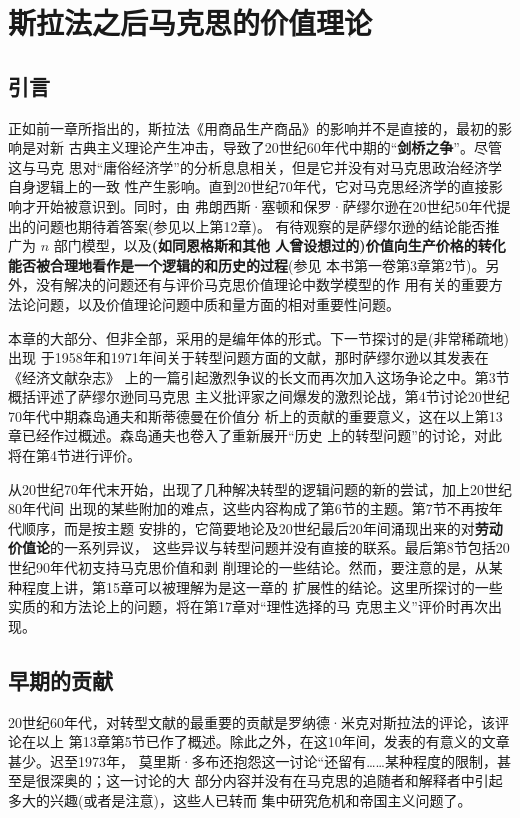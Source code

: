 \chapter{斯拉法之后马克思的价值理论}

\section{引言}

正如前一章所指出的，斯拉法《用商品生产商品》的影响并不是直接的，最初的影响是对新
古典主义理论产生冲击，导致了20世纪60年代中期的“\textbf{剑桥之争}”。尽管这与马克
思对“庸俗经济学”的分析息息相关，但是它并没有对马克思政治经济学自身逻辑上的一致
性产生影响。直到20世纪70年代，它对马克思经济学的直接影响才开始被意识到。同时，由
弗朗西斯·塞顿和保罗·萨缪尔逊在20世纪50年代提出的问题也期待着答案(参见以上第12章)。
有待观察的是萨缪尔逊的结论能否推广为 $n$ 部门模型，以及\textbf{(如同恩格斯和其他
  人曾设想过的)价值向生产价格的转化能否被合理地看作是一个逻辑的和历史的过程}(参见
本书第一卷第3章第2节)。另外，没有解决的问题还有与评价马克思价值理论中数学模型的作
用有关的重要方法论问题，以及价值理论问题中质和量方面的相对重要性问题。

本章的大部分、但非全部，采用的是编年体的形式。下一节探讨的是(非常稀疏地)出现
于1958年和1971年间关于转型问题方面的文献，那时萨缪尔逊以其发表在《经济文献杂志》
上的一篇引起激烈争议的长文而再次加入这场争论之中。第3节概括评述了萨缪尔逊同马克思
主义批评家之间爆发的激烈论战，第4节讨论20世纪70年代中期森岛通夫和斯蒂德曼在价值分
析上的贡献的重要意义，这在以上第13章已经作过概述。森岛通夫也卷入了重新展开“历史
上的转型问题”的讨论，对此将在第4节进行评价。

从20世纪70年代末开始，出现了几种解决转型的逻辑问题的新的尝试，加上20世纪80年代间
出现的某些附加的难点，这些内容构成了第6节的主题。第7节不再按年代顺序，而是按主题
安排的，它简要地论及20世纪最后20年间涌现出来的对\textbf{劳动价值论}的一系列异议，
这些异议与转型问题并没有直接的联系。最后第8节包括20世纪90年代初支持马克思价值和剥
削理论的一些结论。然而，要注意的是，从某种程度上讲，第15章可以被理解为是这一章的
扩展性的结论。这里所探讨的一些实质的和方法论上的问题，将在第17章对“理性选择的马
克思主义”评价时再次出现。

\section{早期的贡献}

20世纪60年代，对转型文献的最重要的贡献是罗纳德·米克对斯拉法的评论，该评论在以上
第13章第5节已作了概述。除此之外，在这10年间，发表的有意义的文章甚少。迟至1973年，
莫里斯·多布还抱怨这一讨论“还留有……某种程度的限制，甚至是很深奥的；这一讨论的大
部分内容并没有在马克思的追随者和解释者中引起多大的兴趣(或者是注意)，这些人已转而
集中研究危机和帝国主义问题了。

